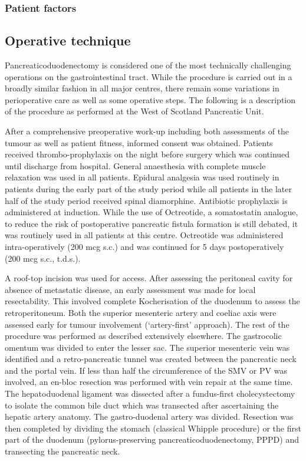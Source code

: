 \subsubsection{Patient factors}
\subsection{Operative technique}
Pancreaticoduodenectomy is considered one of the most technically challenging operations on the gastrointestinal tract. While the procedure is carried out in a broadly similar fashion in all major centres, there remain some variations in perioperative care as well as some operative steps. The following is a description of the procedure as performed at the West of Scotland Pancreatic Unit.

After a comprehensive preoperative work-up including both assessments of the tumour as well as patient fitness, informed consent was obtained. Patients received thrombo-prophylaxis on the night before surgery which was continued until discharge from hospital. General anaesthesia with complete muscle relaxation was used in all patients. Epidural analgesia was used routinely in patients during the early part of the study period while all patients in the later half of the study period received spinal diamorphine. Antibiotic prophylaxis is administered at induction. While the use of Octreotide, a somatostatin analogue, to reduce the risk of postoperative pancreatic fistula formation is still debated, it was routinely used in all patients at this centre. Octreotide was administered intra-operatively (200 mcg s.c.) and was continued for 5 days postoperatively (200 mcg s.c., t.d.s.).

A roof-top incision was used for access. After assessing the peritoneal cavity for absence of metastatic disease, an early assessment was made for local resectability. This involved complete Kocherisation of the duodenum to assess the retroperitoneum. Both the superior mesenteric artery and coeliac axis were assessed early for tumour involvement (‘artery-first’ approach). The rest of the procedure was performed as described extensively elsewhere. The gastrocolic omentum was divided to enter the lesser sac. The superior mesenteric vein was identified and a retro-pancreatic tunnel was created between the pancreatic neck and the portal vein. If less than half the circumference of the SMV or PV was involved, an en-bloc resection was performed with vein repair at the same time. The hepatoduodenal ligament was dissected after a fundus-first cholecystectomy to isolate the common bile duct which was transected after ascertaining the hepatic artery anatomy. The gastro-duodenal artery was divided. Resection was then completed by dividing the stomach (classical Whipple procedure) or the first part of the duodenum (pylorus-preserving pancreaticoduodenectomy, PPPD) and transecting the pancreatic neck.

